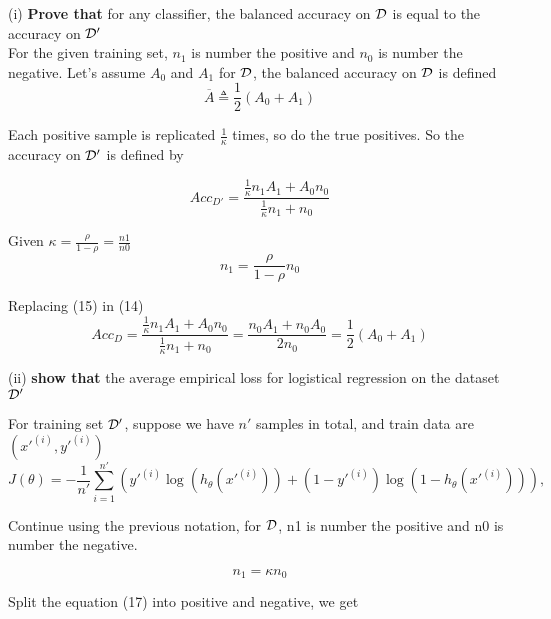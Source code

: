 \begin{answer}

(i) {\bf Prove that} for any classifier, the balanced accuracy on $\mathcal{D}$ is equal to the accuracy on $\mathcal{D}'$ \\

For the given training set, $n_1$ is number the positive and $n_0$ is number the negative. Let's assume $A_0$ and $A_1$ for $\mathcal{D}$, the balanced accuracy on $\mathcal{D}$ is defined 
\begin{equation}
    \overline{A} \triangleq \frac{1}{2} \left(A_0+A_1\right)
\end{equation}

Each positive sample is replicated $\frac{1}{\kappa}$ times, so do the true positives. So the accuracy on $\mathcal{D} '$ is defined by

\begin{equation}
    Acc_{D'} = \frac{\frac{1}{\kappa} n_1 A_1 + A_0 n_0}{\frac{1}{\kappa} n_1 + n_0}
\end{equation}

Given $\kappa = \frac{\rho}{1-\rho} = \frac{n1}{n0}$
\begin{equation}
    n_1 = \frac{\rho}{1 - \rho} n_0
\end{equation}

Replacing (15) in (14)
\begin{equation}
    Acc_D = \frac{\frac{1}{\kappa} n_1 A_1 + A_0 n_0}{\frac{1}{\kappa} n_1 + n_0} = \frac{n_0 A_1 + n_0 A_0}{2 n_0} = \frac{1}{2}(A_0 + A_1)
\end{equation}

(ii) {\bf show that} the average empirical loss for logistical regression on the dataset $\mathcal{D}'$

For training set $\mathcal{D} '$, suppose we have $n'$ samples in total, and train data are $(x'^{(i)}, y'^{(i)})$ 
\begin{equation}
    J(\theta) = -\frac{1}{n'} \sum_{i=1}^{n'} \left( y'^{(i)} \log(h_{\theta}(x'^{(i)})) + (1 - y'^{(i)}) \log(1 - h_{\theta}(x'^{(i)})) \right),
\end{equation}

Continue using the previous notation, for $\mathcal{D}$, n1 is number the positive and n0 is number the negative. 

\begin{equation*}
    n_1 = \kappa n_0
\end{equation*}

Split the equation (17) into positive and negative, we get


\end{answer}
